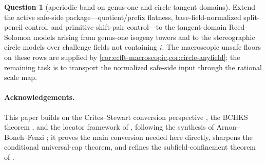 \documentclass[11pt]{article}
\theoremstyle{definition}
\newtheorem{researchquestion}[researchquestion]{Question}
\theoremstyle{remark}
\begin{document}
\begin{researchquestion}[aperiodic band on genus-one and circle tangent domains]\label{prob:isogeny}
Extend the active safe-side package---quotient/prefix flatness, base-field-normalized split-pencil control, and primitive shift-pair control---to the tangent-domain Reed--Solomon models arising from genus-one isogeny towers and to the stereographic circle models over challenge fields not containing $i$.  The macroscopic unsafe floors on these rows are supplied by \cref{cor:ecfft-macroscopic,cor:circle-anyfield}; the remaining task is to transport the normalized safe-side input through the rational scale map.
\end{researchquestion}

\paragraph{Acknowledgements.} This paper builds on the Crites--Stewart conversion perspective \cite{CS25}, the BCHKS theorem \cite{BCHKS25}, and the locator framework of \cite{Cho26a,Cho26b}, following the synthesis of Arnon--Boneh--Fenzi \cite{ABF26}; it proves the main conversion needed here directly, sharpens the conditional universal-cap theorem, and refines the subfield-confinement theorem of \cite{Cho26b}.
\end{document}
